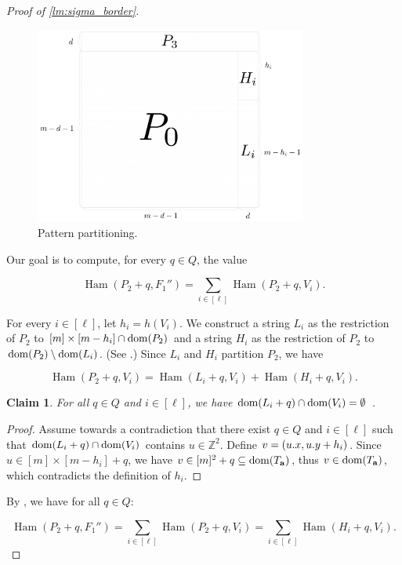 \documentclass[twoside,leqno]{article}
\newtheorem{claim}{Claim}[section]
\newcommand{\Z}{\mathbb{Z}}
\DeclareMathOperator*{\Ham}{Ham}
\begin{document}
\begin{proof}[{Proof of \cref{lm:sigma_border}}]
\begin{figure}[!t]
	\begin{center}
		\includegraphics[width=0.8\textwidth]{drawings/pattern_restriction}
	\end{center}
	\caption{Pattern partitioning.}
	\label{figure:pattern_restriction}
\end{figure}

Our goal is to compute, for every $q \in Q$, the value

\[ \Ham(P_2 + q, F_1'') = \sum_{i \in [\ell]} \Ham(P_2 + q, V_i).\]

For every $i \in [\ell]$, let $h_i = h(V_i)$. We construct a string $L_i$ as the restriction of $P_2$ to $[m] \times [m - h_i] \cap \operatorname*{dom}(P_2)$ and a string $H_i$ as the restriction of $P_2$ to $\operatorname*{dom}(P_2) \setminus \operatorname*{dom}(L_i)$. (See .) Since $L_i$ and $H_i$ partition $P_2$, we have

\[\Ham(P_2 + q, V_i) = \Ham(L_i + q, V_i) + \Ham(H_i + q, V_i). \]

\begin{claim}\label{pattern_height_reduction}
For all $q \in Q$ and $i \in [\ell]$, we have $\operatorname*{dom}(L_i + q) \cap \operatorname*{dom}(V_i) = \emptyset$ .
\end{claim}
\begin{proof}
Assume towards a contradiction that there exist $q \in Q$ and $i \in [\ell]$ such that $\operatorname*{dom}(L_i + q) \cap \operatorname*{dom}(V_i)$ contains $u \in \Z^2$. Define $v = (u.x, u.y + h_i)$.
Since $u \in [m] \times [m - h_i] + q$, we have $v \in [m]^2 + q \subseteq \operatorname*{dom}(T_\mathbf{a})$, thus $v \in \operatorname*{dom}(T_\mathbf{a})$, which contradicts the definition of $h_i$.
\end{proof}

By , we have for all $q \in Q$:

\[\Ham(P_2 + q, F_1'') = \sum_{i \in [\ell]} \Ham(P_2 + q, V_i) = \sum_{i \in [\ell]} \Ham(H_i + q, V_i). \]


\end{proof}
\end{document}
